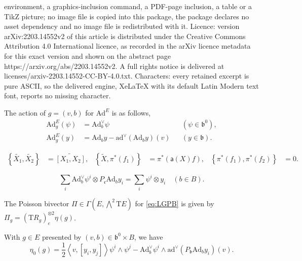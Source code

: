 \documentclass[10pt,a4paper]{amsart}
\newcommand{\Ad}{\mathrm{Ad}}
\newcommand{\ad}{\mathrm{ad}}
\newcommand{\fr}[1]{\mathfrak{#1}}
\newcommand{\largewedge}{\bigwedge}
\newcommand{\ox}{\otimes}
\newcommand{\rT}{\mathrm T}
\newcommand{\sm}[1]{\mathsf{#1}}
\begin{document}
environment, a graphics-inclusion command, a PDF-page inclusion, a table or a TikZ picture; no image file is copied into this package, the package declares no asset dependency and no image file is redistributed with it. Licence: version arXiv:2203.14552v2 of this article is distributed under the Creative Commons Attribution 4.0 International licence, as recorded in the arXiv licence metadata for this exact version and shown on the abstract page https://arxiv.org/abs/2203.14552v2. A full rights notice is delivered at licenses/arxiv-2203.14552-CC-BY-4.0.txt. Characters: every retained excerpt is pure ASCII, so the delivered engine, XeLaTeX with its default Latin Modern text font, reports no missing character.
\begin{lem}
The action of $g = (v, b)$ for $\Ad^{E}$ is as follows,
\begin{align}
\label{eq:ADEAZ} \Ad^{E}_g (\psi) &= \Ad^\vee_b \psi && (\psi \in \fr{b}^0),\\
 \label{eq:ADEA} \Ad^{E}_g (y) &= \Ad_b y - \ad^\vee ( \Ad_b y ) (v) && (y \in \fr{b}).
\end{align}
\end{lem}

\begin{align}
\label{eq:LGPB}
\left\{ \widetilde{X_1} , \widetilde{X_2} \right\} &= \widetilde{\left[ X_1 , X_2 \right]},&
\left\{ \widetilde{X} , \pi^*(f_1) \right\} &= \pi^*\left( \sm{a}(X) f \right),&
\left\{ \pi^*(f_1) , \pi^*(f_2) \right\} &= 0.
\end{align}

\begin{equation}
\label{eq:psi-i-y-i-invariance}
\sum_i \Ad^\vee_b \psi^i \ox P_{\fr{c}}\Ad_b y_i = \sum_i \psi^i \ox y_i \quad (b \in B).
\end{equation}

\begin{lem}
\label{lem:Pi-corresp-to-eta}
The Poisson bivector $\Pi \in \Gamma(E, \largewedge^2 \rT E)$ for \eqref{eq:LGPB} is given by $\Pi_g = (\rT R_g)_e^{\ox 2} \eta(g)$.
\end{lem}

\begin{lem}
With $g \in E$ presented by $(v, b) \in \fr{b}^0 \times B$, we have
\begin{equation}
\eta_0(g) = \frac{1}{2} \left\langle v , \left[ y_i , y_j \right] \right\rangle \psi^i \wedge \psi^j - \Ad^\vee_b \psi^i \wedge \ad^\vee ( P_{\fr{b}}\Ad_b y_i ) (v) . \label{eq:AEFLP}
\end{equation}
\end{lem}
\end{document}
